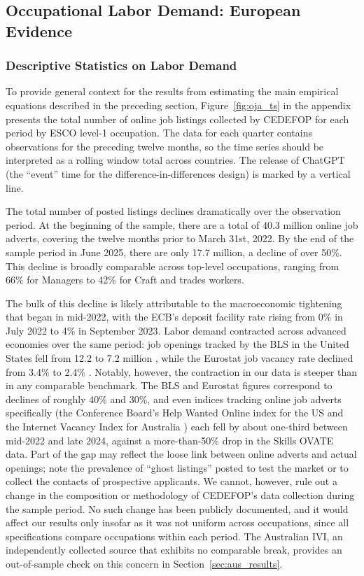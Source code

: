 \documentclass[11pt]{article}
\begin{document}
\subsection{Occupational Labor Demand: European Evidence}

\subsubsection{Descriptive Statistics on Labor Demand}
\label{sec:descriptives}

To provide general context for the results from estimating the main empirical equations described in the preceding section, Figure~\ref{fig:oja_ts} in the appendix presents the total number of online job listings collected by CEDEFOP for each period by ESCO level-1 occupation. The data for each quarter contains observations for the preceding twelve months, so the time series should be interpreted as a rolling window total across countries. The release of ChatGPT (the ``event'' time for the difference-in-differences design) is marked by a vertical line.

The total number of posted listings declines dramatically over the observation period. At the beginning of the sample, there are a total of 40.3 million online job adverts, covering the twelve months prior to March 31st, 2022. By the end of the sample period in June 2025, there are only 17.7 million, a decline of over 50\%. This decline is broadly comparable across top-level occupations, ranging from 66\% for Managers to 42\% for Craft and trades workers.

The bulk of this decline is likely attributable to the macroeconomic tightening that began in mid-2022, with the ECB's deposit facility rate rising from 0\% in July 2022 to 4\% in September 2023. Labor demand contracted across advanced economies over the same period: job openings tracked by the BLS in the United States fell from 12.2 to 7.2 million \citep{bls2025jolts}, while the Eurostat job vacancy rate declined from 3.4\% to 2.4\% \citep{eurostat2024job}. Notably, however, the contraction in our data is steeper than in any comparable benchmark. The BLS and Eurostat figures correspond to declines of roughly 40\% and 30\%, and even indices tracking online job adverts specifically (the Conference Board's Help Wanted Online index for the US \citep{HelpWantedOnline2024} and the Internet Vacancy Index for Australia \citep{InternetVacancyIndex}) each fell by about one-third between mid-2022 and late 2024, against a more-than-50\% drop in the Skills OVATE data. Part of the gap may reflect the loose link between online adverts and actual openings; \citet{cedefop2019online} note the prevalence of ``ghost listings'' posted to test the market or to collect the contacts of prospective applicants. We cannot, however, rule out a change in the composition or methodology of CEDEFOP's data collection during the sample period. No such change has been publicly documented, and it would affect our results only insofar as it was not uniform across occupations, since all specifications compare occupations within each period. The Australian IVI, an independently collected source that exhibits no comparable break, provides an out-of-sample check on this concern in Section~\ref{sec:aus_results}.
\end{document}
